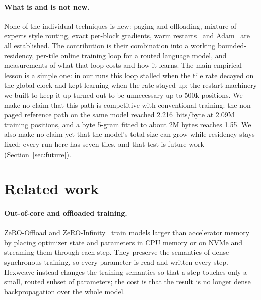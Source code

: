 \documentclass[10pt]{article}
\newcommand{\bpb}{bits/byte}
\begin{document}
\paragraph{What is and is not new.}
None of the individual techniques is new: paging and offloading, mixture-of-experts style routing,
exact per-block gradients, warm restarts~\citep{loshchilov2017sgdr} and Adam~\citep{kingma2015adam}
are all established. The contribution is their combination into a working bounded-residency,
per-tile online training loop for a routed language model, and measurements of what that loop costs
and how it learns. The main empirical lesson is a simple one: in our runs this loop stalled when the tile rate
decayed on the global clock and kept learning when the rate stayed up; the restart machinery we built
to keep it up turned out to be unnecessary up to 500k positions.
We make no claim that this path is competitive with conventional training: the
non-paged reference path on the same model reached 2.216~\bpb{} at 2.09M training positions, and a
byte 5-gram fitted to about 2M bytes reaches 1.55. We also make no claim yet that the model's total
size can grow while residency stays fixed; every run here has seven tiles, and that test is future
work (Section~\ref{sec:future}).

\section{Related work}

\paragraph{Out-of-core and offloaded training.}
ZeRO-Offload and ZeRO-Infinity~\citep{ren2021zerooffload,rajbhandari2021zeroinfinity} train models
larger than accelerator memory by placing optimizer state and parameters in CPU memory or on NVMe and
streaming them through each step. They preserve the semantics of dense synchronous training, so every
parameter is read and written every step. Hexweave instead changes the training semantics so that a
step touches only a small, routed subset of parameters; the cost is that the result is no longer
dense backpropagation over the whole model.
\end{document}
